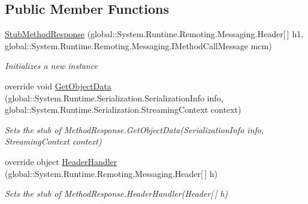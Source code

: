 \subsection*{Public Member Functions}
\begin{DoxyCompactItemize}
\item 
\hyperlink{class_system_1_1_runtime_1_1_remoting_1_1_messaging_1_1_fakes_1_1_stub_method_response_ad7dee739178fb9d5138fe7bef7cb6694}{Stub\-Method\-Response} (global\-::\-System.\-Runtime.\-Remoting.\-Messaging.\-Header\mbox{[}$\,$\mbox{]} h1, global\-::\-System.\-Runtime.\-Remoting.\-Messaging.\-I\-Method\-Call\-Message mcm)
\begin{DoxyCompactList}\small\item\em Initializes a new instance\end{DoxyCompactList}\item 
override void \hyperlink{class_system_1_1_runtime_1_1_remoting_1_1_messaging_1_1_fakes_1_1_stub_method_response_af964286cc2bcd3ca2146e6dedb6bc1fb}{Get\-Object\-Data} (global\-::\-System.\-Runtime.\-Serialization.\-Serialization\-Info info, global\-::\-System.\-Runtime.\-Serialization.\-Streaming\-Context context)
\begin{DoxyCompactList}\small\item\em Sets the stub of Method\-Response.\-Get\-Object\-Data(\-Serialization\-Info info, Streaming\-Context context)\end{DoxyCompactList}\item 
override object \hyperlink{class_system_1_1_runtime_1_1_remoting_1_1_messaging_1_1_fakes_1_1_stub_method_response_ae8ec5a0ea7101f7566d74827e2d2409d}{Header\-Handler} (global\-::\-System.\-Runtime.\-Remoting.\-Messaging.\-Header\mbox{[}$\,$\mbox{]} h)
\begin{DoxyCompactList}\small\item\em Sets the stub of Method\-Response.\-Header\-Handler(\-Header\mbox{[}$\,$\mbox{]} h)\end{DoxyCompactList}\end{DoxyCompactItemize}
